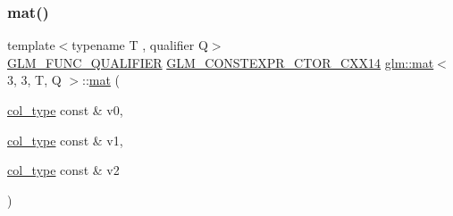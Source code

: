 \mbox{\label{structglm_1_1mat_3_013_00_013_00_01_t_00_01_q_01_4_ad30f02f6ec62ee27aafed654223014a2}} 
\subsubsection{\texorpdfstring{mat()}{mat()}\hspace{0.1cm}{\footnotesize\ttfamily [6/21]}}
{\footnotesize\ttfamily template$<$typename T , qualifier Q$>$ \\
\mbox{\hyperlink{setup_8hpp_a33fdea6f91c5f834105f7415e2a64407}{G\+L\+M\+\_\+\+F\+U\+N\+C\+\_\+\+Q\+U\+A\+L\+I\+F\+I\+ER}} \mbox{\hyperlink{setup_8hpp_a0900f9145e68bf6061b6f5e7be3fa751}{G\+L\+M\+\_\+\+C\+O\+N\+S\+T\+E\+X\+P\+R\+\_\+\+C\+T\+O\+R\+\_\+\+C\+X\+X14}} \mbox{\hyperlink{structglm_1_1mat}{glm\+::mat}}$<$ 3, 3, T, Q $>$\+::\mbox{\hyperlink{structglm_1_1mat}{mat}} (\begin{DoxyParamCaption}\item[{\mbox{\hyperlink{structglm_1_1mat_3_013_00_013_00_01_t_00_01_q_01_4_a4d84bef3685131dbb0ac43cac0a3b147}{col\+\_\+type}} const \&}]{v0,  }\item[{\mbox{\hyperlink{structglm_1_1mat_3_013_00_013_00_01_t_00_01_q_01_4_a4d84bef3685131dbb0ac43cac0a3b147}{col\+\_\+type}} const \&}]{v1,  }\item[{\mbox{\hyperlink{structglm_1_1mat_3_013_00_013_00_01_t_00_01_q_01_4_a4d84bef3685131dbb0ac43cac0a3b147}{col\+\_\+type}} const \&}]{v2 }\end{DoxyParamCaption})}

\mbox{\label{structglm_1_1mat_3_013_00_013_00_01_t_00_01_q_01_4_a36c7325f7b4164d6ed70aab38cf5828c}} 
